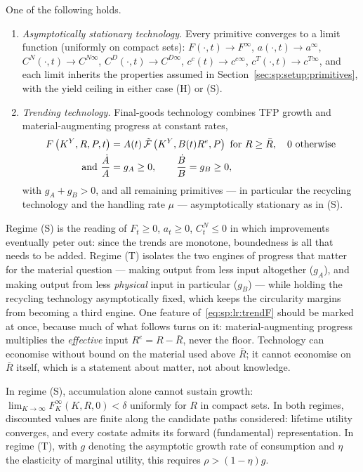 \begin{assumption}\label{ass:lr:tech}
One of the following holds.
\begin{enumerate}
    \item[(S)] \emph{Asymptotically stationary technology.} Every primitive converges to a limit function (uniformly on compact sets): $F\left(\cdot,t\right)\to F^\infty$, $a\left(\cdot,t\right)\to a^\infty$, $C^N\left(\cdot,t\right)\to C^{N\infty}$, $C^D\left(\cdot,t\right)\to C^{D\infty}$, $c^c(t)\to c^{c\infty}$, $c^T\left(\cdot,t\right)\to c^{T\infty}$, and each limit inherits the properties assumed in Section~\ref{sec:sp:setup:primitives}, with the yield ceiling in either case (H) or (S).
    \item[(T)] \emph{Trending technology.} Final-goods technology combines TFP growth and material-augmenting progress at constant rates,
    \begin{align}
        F\left(K^Y,R,P,t\right) &= A(t)\,\tilde{\mathcal F}\left(K^Y,B(t)R^{e},P\right)\ \text{for }R\ge\bar R,\quad 0\text{ otherwise} \label{eq:sp:lr:trendF} \\
        \text{and }\frac{\dot A}{A}&=g_A\ge0, \qquad 
        \frac{\dot B}{B}=g_B\ge0, \notag
    \end{align}
    with $g_A+g_B>0$, and all remaining primitives --- in particular the recycling technology and the handling rate $\mu$ --- asymptotically stationary as in (S).
\end{enumerate}
\end{assumption}

Regime (S) is the reading of $F_t\ge0$, $a_t\ge0$, $C^N_t\le0$ in which improvements eventually peter out: since the trends are monotone, boundedness is all that needs to be added. Regime (T) isolates the two engines of progress that matter for the material question --- making output from less input altogether ($g_A$), and making output from less \emph{physical} input in particular ($g_B$) --- while holding the recycling technology asymptotically fixed, which keeps the circularity margins from becoming a third engine. One feature of~\eqref{eq:sp:lr:trendF} should be marked at once, because much of what follows turns on it: material-augmenting progress multiplies the \emph{effective} input $R^e=R-\bar R$, never the floor. Technology can economise without bound on the material used above $\bar R$; it cannot economise on $\bar R$ itself, which is a statement about matter, not about knowledge.

\begin{assumption}\label{ass:lr:bounded}
In regime (S), accumulation alone cannot sustain growth: $\lim_{K\to\infty}F^\infty_K\left(K,R,0\right)<\delta$ uniformly for $R$ in compact sets. In both regimes, discounted values are finite along the candidate paths considered: lifetime utility converges, and every costate admits its forward (fundamental) representation. In regime (T), with $g$ denoting the asymptotic growth rate of consumption and $\eta$ the elasticity of marginal utility, this requires $\rho>\left(1-\eta\right)g$.
\end{assumption}

